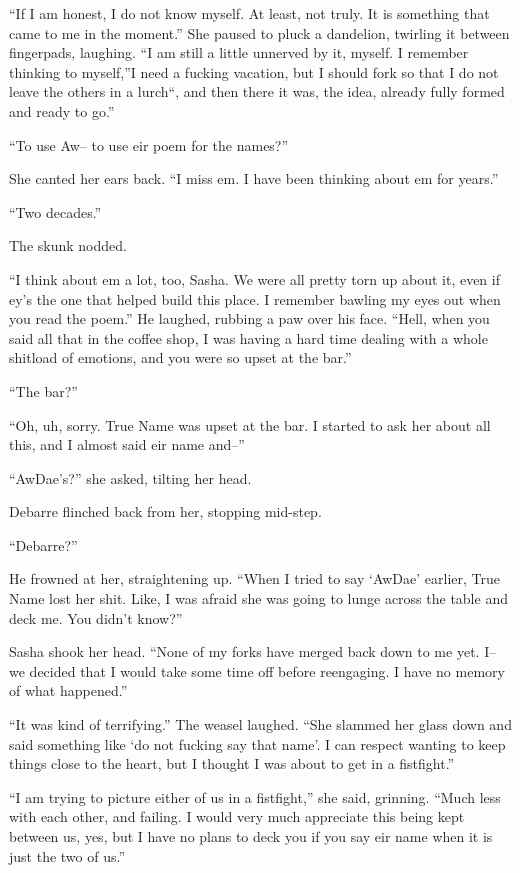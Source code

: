 ``If I am honest, I do not know myself. At least, not truly. It is something that came to me in the moment.'' She paused to pluck a dandelion, twirling it between fingerpads, laughing. ``I am still a little unnerved by it, myself. I remember thinking to myself,''I need a fucking vacation, but I should fork so that I do not leave the others in a lurch``, and then there it was, the idea, already fully formed and ready to go.''

``To use Aw-- to use eir poem for the names?''

She canted her ears back. ``I miss em. I have been thinking about em for years.''

``Two decades.''

The skunk nodded.

``I think about em a lot, too, Sasha. We were all pretty torn up about it, even if ey's the one that helped build this place. I remember bawling my eyes out when you read the poem.'' He laughed, rubbing a paw over his face. ``Hell, when you said all that in the coffee shop, I was having a hard time dealing with a whole shitload of emotions, and you were so upset at the bar.''

``The bar?''

``Oh, uh, sorry. True Name was upset at the bar. I started to ask her about all this, and I almost said eir name and--''

``AwDae's?'' she asked, tilting her head.

Debarre flinched back from her, stopping mid-step.

``Debarre?''

He frowned at her, straightening up. ``When I tried to say `AwDae' earlier, True Name lost her shit. Like, I was afraid she was going to lunge across the table and deck me. You didn't know?''

Sasha shook her head. ``None of my forks have merged back down to me yet. I-- we decided that I would take some time off before reengaging. I have no memory of what happened.''

``It was kind of terrifying.'' The weasel laughed. ``She slammed her glass down and said something like `do not fucking say that name'. I can respect wanting to keep things close to the heart, but I thought I was about to get in a fistfight.''

``I am trying to picture either of us in a fistfight,'' she said, grinning. ``Much less with each other, and failing. I would very much appreciate this being kept between us, yes, but I have no plans to deck you if you say eir name when it is just the two of us.''

